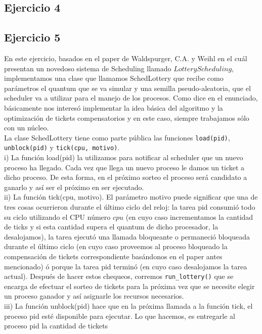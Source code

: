 \documentclass[a4paper]{article}
\begin{document}
\newpage
\subsection{Ejercicio 4}

\newpage
\subsection{Ejercicio 5}
En este ejercicio, basados en el paper de Waldspurger, C.A. y Weihl en el cu\'al presentan un 
novedoso sistema de Scheduling llamado $Lottery Scheduling$, implementamos una clase que llamamos
SchedLottery que recibe como par\'ametros el quantum que se va simular y una semilla 
pseudo-aleatoria, que el scheduler va a utilizar para el manejo de los procesos. Como dice en el
enunciado, b\'asicamente nos interes\'o implementar la idea b\'asica del algoritmo y la 
optimizaci\'on de tickets compensatorios y en este caso, siempre trabajamos s\'olo con un n\'ucleo. \\
La clase SchedLottery tiene como parte p\'ublica las funciones \texttt{load(pid)}, \texttt{unblock(pid)} 
y \texttt{tick(cpu, motivo)}. \\
i) La funci\'on load(pid) la utilizamos para notificar al scheduler
que un nuevo proceso ha llegado. Cada vez que llega un nuevo proceso le damos un ticket a dicho proceso.
De esta forma, en el pr\'oximo sorteo el proceso ser\'a candidato a ganarlo y as\'i ser el pr\'oximo 
en ser ejecutado. \\
ii) La funci\'on
tick(cpu, motivo). El par\'ametro motivo puede significar que una de tres cosas
ocurrieron durante el \'ultimo ciclo del reloj: la tarea pid consumi\'o todo su
ciclo utilizando el CPU n\'umero $cpu$ (en cuyo caso incrementamos la cantidad de ticks y si esta cantidad supera el
quantum de dicho procesador, la desalojamos), la tarea ejecut\'o una llamada bloqueante o permaneci\'o 
bloqueada durante el \'ultimo ciclo (en cuyo caso proveemos al proceso bloqueado la compensaci\'on 
de tickets correspondiente bas\'andonos en el paper antes mencionado) \'o porque la tarea pid 
termin\'o (en cuyo caso desalojamos la tarea
actual). Despu\'es de hacer estos chequeos, corremos \texttt{run\_lottery()} que se encarga de efectuar el 
sorteo de tickets para la pr\'oxima vez que se necesite elegir un proceso ganador y as\'i asignarle 
los recursos necesarios. \\
iii) La funci\'on unblock(pid) hace que en la pr\'oxima llamada a la funci\'on tick, el proceso pid 
est\'e disponible para ejecutar. Lo que hacemos, es entregarle al proceso pid la cantidad de tickets
\end{document}
